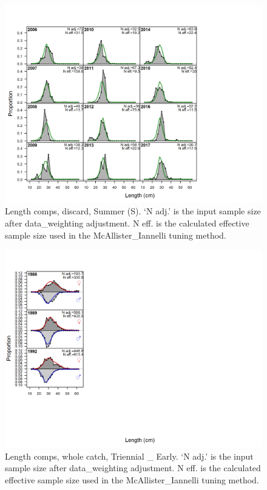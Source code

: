 \documentclass[12pt,]{article}
\begin{document}
\begin{figure}
\centering
\includegraphics{r4ss/plots_mod1/comp_lenfit_flt4mkt1.png}
\caption{Length comps, discard, Summer (S). `N adj.' is the input sample
size after data\_weighting adjustment. N eff. is the calculated
effective sample size used in the McAllister\_Iannelli tuning method.
\label{fig:length_fits}}
\end{figure}

\begin{figure}
\centering
\includegraphics{r4ss/plots_mod1/comp_lenfit_flt5mkt0.png}
\caption{Length comps, whole catch, Triennial \_ Early. `N adj.' is the
input sample size after data\_weighting adjustment. N eff. is the
calculated effective sample size used in the McAllister\_Iannelli tuning
method. \label{fig:length_fits}}
\end{figure}
\end{document}
